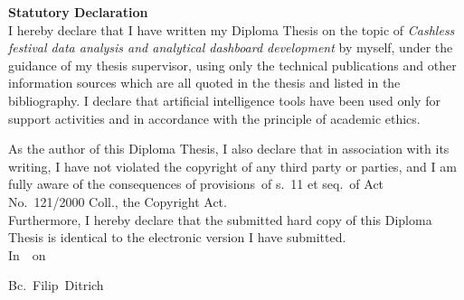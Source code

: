 \newpage
\pagestyle{empty}

\noindent
{\large\bfseries Statutory Declaration}\\

\noindent
I hereby declare that I have written my Diploma Thesis on the topic of \textit{Cashless festival data analysis and analytical dashboard development} by myself, under the guidance of my thesis supervisor, using only the technical publications and other information sources which are all quoted in the thesis and listed in the bibliography.
I declare that artificial intelligence tools have been used only for support activities and in accordance with the principle of academic ethics.

As the author of this Diploma Thesis, I also declare that in association with its writing, I have not violated the copyright of any third party or parties, and I am fully aware of the consequences of provisions~of s.~11 et seq.~of Act No.~121/2000 Coll., the Copyright Act.\\

Furthermore, I hereby declare that the submitted hard copy of this Diploma Thesis is identical to the electronic version I have submitted.\\

\vspace{18mm}
\noindent
In~\makebox[4cm]{\dotfill}~on~\makebox[2.5cm]{\dotfill}
\hspace*{\fill}
\makebox[4cm]{\dotfill}

\begin{flushright}
	\noindent
	Bc.~Filip~Ditrich
\end{flushright}

